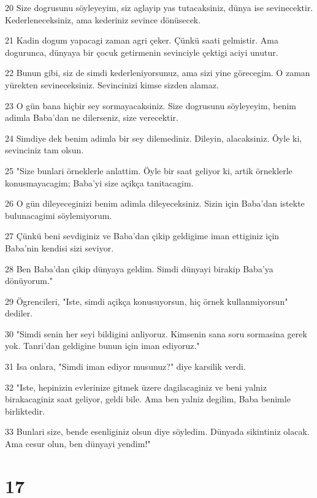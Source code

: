 \par 20 Size dogrusunu söyleyeyim, siz aglayip yas tutacaksiniz, dünya ise sevinecektir. Kederleneceksiniz, ama kederiniz sevince dönüsecek.
\par 21 Kadin dogum yapacagi zaman agri çeker. Çünkü saati gelmistir. Ama dogurunca, dünyaya bir çocuk getirmenin sevinciyle çektigi aciyi unutur.
\par 22 Bunun gibi, siz de simdi kederleniyorsunuz, ama sizi yine görecegim. O zaman yürekten sevineceksiniz. Sevincinizi kimse sizden alamaz.
\par 23 O gün bana hiçbir sey sormayacaksiniz. Size dogrusunu söyleyeyim, benim adimla Baba'dan ne dilerseniz, size verecektir.
\par 24 Simdiye dek benim adimla bir sey dilemediniz. Dileyin, alacaksiniz. Öyle ki, sevinciniz tam olsun.
\par 25 "Size bunlari örneklerle anlattim. Öyle bir saat geliyor ki, artik örneklerle konusmayacagim; Baba'yi size açikça tanitacagim.
\par 26 O gün dileyeceginizi benim adimla dileyeceksiniz. Sizin için Baba'dan istekte bulunacagimi söylemiyorum.
\par 27 Çünkü beni sevdiginiz ve Baba'dan çikip geldigime iman ettiginiz için Baba'nin kendisi sizi seviyor.
\par 28 Ben Baba'dan çikip dünyaya geldim. Simdi dünyayi birakip Baba'ya dönüyorum."
\par 29 Ögrencileri, "Iste, simdi açikça konusuyorsun, hiç örnek kullanmiyorsun" dediler.
\par 30 "Simdi senin her seyi bildigini anliyoruz. Kimsenin sana soru sormasina gerek yok. Tanri'dan geldigine bunun için iman ediyoruz."
\par 31 Isa onlara, "Simdi iman ediyor musunuz?" diye karsilik verdi.
\par 32 "Iste, hepinizin evlerinize gitmek üzere dagilacaginiz ve beni yalniz birakacaginiz saat geliyor, geldi bile. Ama ben yalniz degilim, Baba benimle birliktedir.
\par 33 Bunlari size, bende esenliginiz olsun diye söyledim. Dünyada sikintiniz olacak. Ama cesur olun, ben dünyayi yendim!"

\chapter{17}

